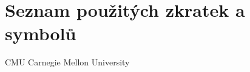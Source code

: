 \chapter{Seznam použitých zkratek a symbolů}
\symbolsize=3.5cm%
\vspace{7mm}
\begin{symboly}

\item[CMU] Carnegie Mellon University

\end{symboly}
